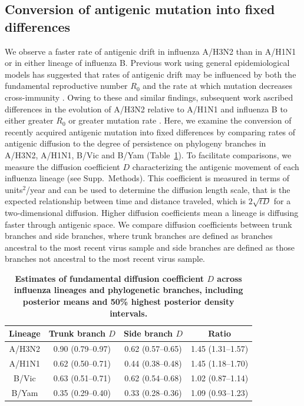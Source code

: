 \documentclass[11pt,oneside,letterpaper]{article}
\begin{document}
\subsection*{Conversion of antigenic mutation into fixed differences}

We observe a faster rate of antigenic drift in influenza A/H3N2 than in A/H1N1 or in either lineage of influenza B.
Previous work using general epidemiological models has suggested that rates of antigenic drift may be influenced by both the fundamental reproductive number $R_0$ and the rate at which mutation decreases cross-immunity \cite{Gog02,Lin03}.
Owing to these and similar findings, subsequent work ascribed differences in the evolution of A/H3N2 relative to A/H1N1 and influenza B to either greater $R_0$ or greater mutation rate \cite{Ferguson03,Bedford12}.
Here, we examine the conversion of recently acquired antigenic mutation into fixed differences by comparing rates of antigenic diffusion to the degree of persistence on phylogeny branches in A/H3N2, A/H1N1, B/Vic and B/Yam (Table~\ref{diffusiontable}).
To facilitate comparisons, we measure the diffusion coefficient $D$ \cite{Pybus12} characterizing the antigenic movement of each influenza lineage (see Supp.\ Methods).
This coefficient is measured in terms of units$^2$/year and can be used to determine the diffusion length scale, that is the expected relationship between time and distance traveled, which is $2 \sqrt{t D}$ for a two-dimensional diffusion.
Higher diffusion coefficients mean a lineage is diffusing faster through antigenic space.
We compare diffusion coefficients between trunk branches and side branches, where trunk branches are defined as branches ancestral to the most recent virus sample and side branches are defined as those branches not ancestral to the most recent virus sample.

\begin{table}[h]
	\centering
	\caption{\textbf{Estimates of fundamental diffusion coefficient $D$ across influenza lineages and phylogenetic branches, including posterior means and 50\% highest posterior density intervals.}}
	\label{diffusiontable}	
	\begin{tabular}{ c c c c } 
	\hline
	Lineage	&	Trunk branch $D$ 	& 	Side branch $D$		& 	Ratio \\
	\hline		
	A/H3N2	&	0.90 (0.79--0.97)	&	0.62 (0.57--0.65)	&	1.45 (1.31--1.57) \\
	A/H1N1	&	0.62 (0.50--0.71)	&	0.44 (0.38--0.48)	&	1.45 (1.18--1.70) \\
	B/Vic	&	0.63 (0.51--0.71)	&	0.62 (0.54--0.68)	&	1.02 (0.87--1.14) \\
	B/Yam	&	0.35 (0.29--0.40)	&	0.33 (0.28--0.36)	&	1.09 (0.93--1.23) \\
	\hline
	\end{tabular}	
\end{table}
\end{document}
